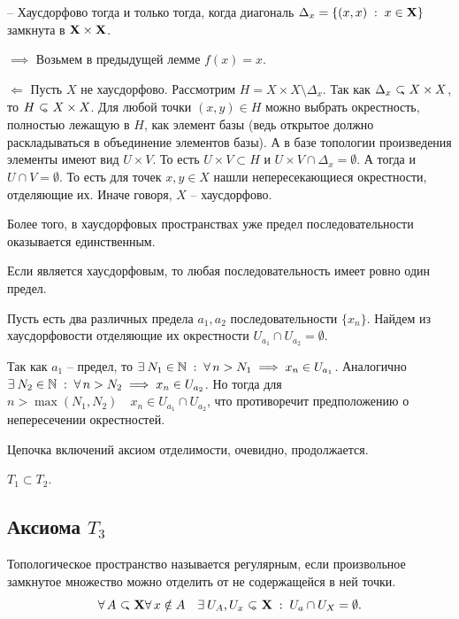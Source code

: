 \begin{Cor}
     \topX -- Хаусдорфово тогда и только тогда, когда диагональ $\Delta_x = \left\{ (x, x) \; : \; x \in \mathbf{X} \right\}$ замкнута в $\mathbf{X} \times \mathbf{X}$.
\end{Cor}
\begin{Proof}
    $\implies$ Возьмем в предыдущей лемме $f(x) = x$.

    $\Longleftarrow$ Пусть $X$ не хаусдорфово. Рассмотрим $H = X \times X \setminus \Delta_x$. Так как $\Delta_x \closed X \times X$, то $H \open X\times X$. Для любой точки $(x,y) \in H$ можно выбрать окрестность, полностью лежащую в $H$, как элемент базы (ведь открытое должно раскладываться в объединение элементов базы). А в базе топологии произведения элементы имеют вид $U \times V$. То есть $U \times V \subset H$ и $U \times V \cap \Delta_x = \emptyset$. А тогда и $U\cap V = \emptyset$. То есть для точек $x,y \in X$ нашли непересекающиеся окрестности, отделяющие их. Иначе говоря, $X$   -- хаусдорфово.
\end{Proof}

Более того, в хаусдорфовых пространствах уже предел последовательности оказывается единственным.
\begin{Prop}
    Если \topX является хаусдорфовым, то любая последовательность имеет ровно один предел.
\end{Prop}
\begin{Proof}
Пусть есть два различных предела $a_1, a_2$ последовательности $\{x_n\}$. Найдем из хаусдорфовости отделяющие их окрестности $U_{a_1} \cap U_{a_2} = \emptyset $. 
    
Так как $a_1$ -- предел, то $\exists N_1 \in \mathbb{N} \st \forall n> N_1 \implies x_n \in U_{a_1}$. Аналогично $\exists N_2 \in \mathbb{N} \st \forall n> N_2 \implies x_n \in U_{a_2}$. Но тогда для $n > \max(N_1, N_2) \quad x_n \in U_{a_1} \cap U_{a_2}$, что противоречит предположению о непересечении окрестностей.
\end{Proof}

Цепочка включений аксиом отделимости, очевидно, продолжается.
\begin{Lem}
    $T_1 \subset T_2$.
\end{Lem}

\subsection{Аксиома $T_3$}
\begin{Def}
    Топологическое пространство \topX называется регулярным, если произвольное замкнутое множество можно отделить от не содержащейся в ней точки.
    \[
    \forall A \closed \X \forall x \notin A  \quad \exists U_A, U_x \open \X  \st U_a \cap U_X = \emptyset.
    \] 
\end{Def}

